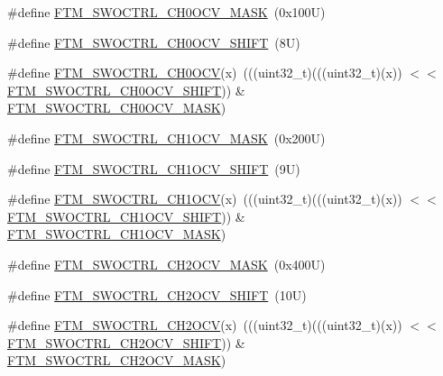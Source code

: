 \begin{DoxyCompactItemize}
\item 
\#define \mbox{\hyperlink{group___f_t_m___register___masks_ga83766e89cee45d6c03318d8031258d17}{F\+T\+M\+\_\+\+S\+W\+O\+C\+T\+R\+L\+\_\+\+C\+H0\+O\+C\+V\+\_\+\+M\+A\+SK}}~(0x100\+U)
\item 
\#define \mbox{\hyperlink{group___f_t_m___register___masks_gaa2983e96c36fff64f21bf488473f902d}{F\+T\+M\+\_\+\+S\+W\+O\+C\+T\+R\+L\+\_\+\+C\+H0\+O\+C\+V\+\_\+\+S\+H\+I\+FT}}~(8\+U)
\item 
\#define \mbox{\hyperlink{group___f_t_m___register___masks_gac96895592539ac8ac65cdd99cc6e0180}{F\+T\+M\+\_\+\+S\+W\+O\+C\+T\+R\+L\+\_\+\+C\+H0\+O\+CV}}(x)~(((uint32\+\_\+t)(((uint32\+\_\+t)(x)) $<$$<$ \mbox{\hyperlink{group___f_t_m___register___masks_gaa2983e96c36fff64f21bf488473f902d}{F\+T\+M\+\_\+\+S\+W\+O\+C\+T\+R\+L\+\_\+\+C\+H0\+O\+C\+V\+\_\+\+S\+H\+I\+FT}})) \& \mbox{\hyperlink{group___f_t_m___register___masks_ga83766e89cee45d6c03318d8031258d17}{F\+T\+M\+\_\+\+S\+W\+O\+C\+T\+R\+L\+\_\+\+C\+H0\+O\+C\+V\+\_\+\+M\+A\+SK}})
\item 
\#define \mbox{\hyperlink{group___f_t_m___register___masks_gab32bd89d8a7fe488b8bdbbfc753a05aa}{F\+T\+M\+\_\+\+S\+W\+O\+C\+T\+R\+L\+\_\+\+C\+H1\+O\+C\+V\+\_\+\+M\+A\+SK}}~(0x200\+U)
\item 
\#define \mbox{\hyperlink{group___f_t_m___register___masks_ga277368cadfcfb45d0f011cfa5bba13c5}{F\+T\+M\+\_\+\+S\+W\+O\+C\+T\+R\+L\+\_\+\+C\+H1\+O\+C\+V\+\_\+\+S\+H\+I\+FT}}~(9\+U)
\item 
\#define \mbox{\hyperlink{group___f_t_m___register___masks_ga0cbac441ec1e538018fee7b97a3ec6a7}{F\+T\+M\+\_\+\+S\+W\+O\+C\+T\+R\+L\+\_\+\+C\+H1\+O\+CV}}(x)~(((uint32\+\_\+t)(((uint32\+\_\+t)(x)) $<$$<$ \mbox{\hyperlink{group___f_t_m___register___masks_ga277368cadfcfb45d0f011cfa5bba13c5}{F\+T\+M\+\_\+\+S\+W\+O\+C\+T\+R\+L\+\_\+\+C\+H1\+O\+C\+V\+\_\+\+S\+H\+I\+FT}})) \& \mbox{\hyperlink{group___f_t_m___register___masks_gab32bd89d8a7fe488b8bdbbfc753a05aa}{F\+T\+M\+\_\+\+S\+W\+O\+C\+T\+R\+L\+\_\+\+C\+H1\+O\+C\+V\+\_\+\+M\+A\+SK}})
\item 
\#define \mbox{\hyperlink{group___f_t_m___register___masks_gaa48e37bd5004ccb2bce43692fa0c1a80}{F\+T\+M\+\_\+\+S\+W\+O\+C\+T\+R\+L\+\_\+\+C\+H2\+O\+C\+V\+\_\+\+M\+A\+SK}}~(0x400\+U)
\item 
\#define \mbox{\hyperlink{group___f_t_m___register___masks_ga000183d4ecd255b5497ec73ea76f5cbc}{F\+T\+M\+\_\+\+S\+W\+O\+C\+T\+R\+L\+\_\+\+C\+H2\+O\+C\+V\+\_\+\+S\+H\+I\+FT}}~(10\+U)
\item 
\#define \mbox{\hyperlink{group___f_t_m___register___masks_gae4824379acd8198a481c6048cdcee338}{F\+T\+M\+\_\+\+S\+W\+O\+C\+T\+R\+L\+\_\+\+C\+H2\+O\+CV}}(x)~(((uint32\+\_\+t)(((uint32\+\_\+t)(x)) $<$$<$ \mbox{\hyperlink{group___f_t_m___register___masks_ga000183d4ecd255b5497ec73ea76f5cbc}{F\+T\+M\+\_\+\+S\+W\+O\+C\+T\+R\+L\+\_\+\+C\+H2\+O\+C\+V\+\_\+\+S\+H\+I\+FT}})) \& \mbox{\hyperlink{group___f_t_m___register___masks_gaa48e37bd5004ccb2bce43692fa0c1a80}{F\+T\+M\+\_\+\+S\+W\+O\+C\+T\+R\+L\+\_\+\+C\+H2\+O\+C\+V\+\_\+\+M\+A\+SK}})
$$
\end{DoxyCompactItemize}
